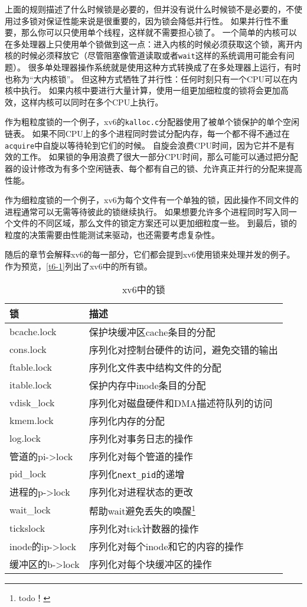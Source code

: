 上面的规则描述了什么时候锁是必要的，但并没有说什么时候锁不是必要的，不使用过多锁对保证性能来说是很重要的，因为锁会降低并行性。
如果并行性不重要，那么你可以只使用单个线程，这样就不需要担心锁了。
一个简单的内核可以在多处理器上只使用单个锁做到这一点：进入内核的时候必须获取这个锁，离开内核的时候必须释放它（尽管阻塞像管道读取或者\texttt{wait}这样的系统调用可能会有问题）。
很多单处理器操作系统就是使用这种方式转换成了在多处理器上运行，有时也称为“大内核锁”。
但这种方式牺牲了并行性：任何时刻只有一个CPU可以在内核中执行。
如果内核中要进行大量计算，使用一组更加细粒度的锁将会更加高效，这样内核可以同时在多个CPU上执行。

作为粗粒度锁的一个例子，xv6的\texttt{kalloc.c}分配器使用了被单个锁保护的单个空闲链表。
如果不同CPU上的多个进程同时尝试分配内存，每一个都不得不通过在\texttt{acquire}中自旋以等待轮到它们的时候。
自旋会浪费CPU时间，因为它并不是有效的工作。
如果锁的争用浪费了很大一部分CPU时间，那么可能可以通过把分配器的设计修改为有多个空闲链表、每个都有自己的锁、允许真正并行的分配来提高性能。

作为细粒度锁的一个例子，xv6为每个文件有一个单独的锁，因此操作不同文件的进程通常可以无需等待彼此的锁继续执行。
如果想要允许多个进程同时写入同一个文件的不同区域，那么文件的锁定方案还可以更加细粒度一些。
到最后，锁的粒度的决策需要由性能测试来驱动，也还需要考虑复杂性。

随后的章节会解释xv6的每一部分，它们都会提到xv6使用锁来处理并发的例子。
作为预览，\autoref{t6-1}列出了xv6中的所有锁。

\begin{table}[htbp]
    \centering
    \begin{tabular}{l|l}
        \textbf{锁}     & \textbf{描述} \\
        \hline
        bcache.lock     & 保护块缓冲区cache条目的分配   \\
        cons.lock       & 序列化对控制台硬件的访问，避免交错的输出  \\
        ftable.lock     & 序列化文件表中结构文件的分配  \\
        itable.lock     & 保护内存中inode条目的分配     \\
        vdisk\_lock     & 序列化对磁盘硬件和DMA描述符队列的访问     \\
        kmem.lock       & 序列化内存的分配      \\
        log.lock        & 序列化对事务日志的操作    \\
        管道的pi->lock   & 序列化对每个管道的操作    \\
        pid\_lock       & 序列化\texttt{next\_pid}的递增    \\
        进程的p->lock    & 序列化对进程状态的更改   \\
        wait\_lock      & 帮助wait避免丢失的唤醒\footnote{todo！}    \\
        tickslock       & 序列化对tick计数器的操作  \\
        inode的ip->lock & 序列化对每个inode和它的内容的操作 \\
        缓冲区的b->lock  & 序列化对每个块缓冲区的操作   \\
    \end{tabular}
    \caption{xv6中的锁}
    \label{t6-1}
\end{table}

